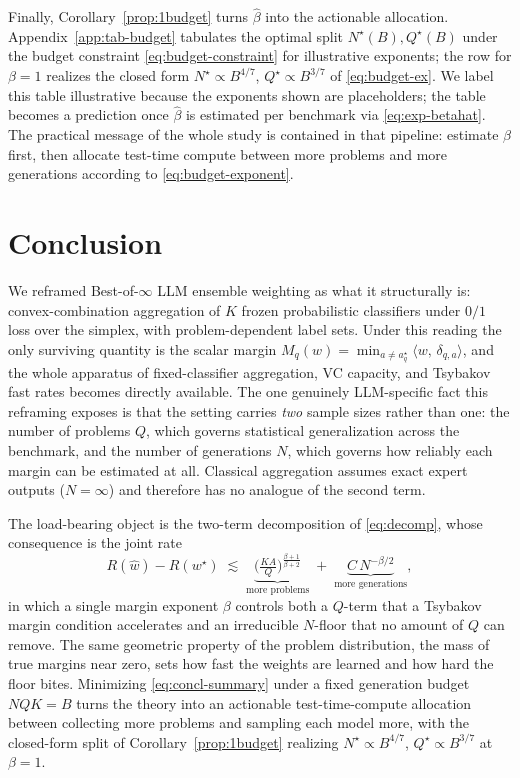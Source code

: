 \documentclass{article} %
\providecommand{\Risk}{R}
\providecommand{\ip}[2]{\langle #1,\, #2\rangle}
\providecommand{\what}{\widehat{w}}
\providecommand{\wstar}{w^{\star}}
\begin{document}
Finally, Corollary~\ref{prop:1budget} turns $\hat\beta$ into the actionable
allocation. Appendix~\ref{app:tab-budget} tabulates the optimal split $N^\star(B),
Q^\star(B)$ under the budget constraint \eqref{eq:budget-constraint} for
illustrative exponents; the row for $\beta=1$ realizes the closed form
$N^\star\propto B^{4/7}$, $Q^\star\propto B^{3/7}$ of \eqref{eq:budget-ex}. We
label this table illustrative because the exponents shown are placeholders; the
table becomes a prediction once $\hat\beta$ is estimated per benchmark via
\eqref{eq:exp-betahat}. The practical message of the whole study is contained in
that pipeline: estimate $\beta$ first, then allocate test-time compute between more
problems and more generations according to \eqref{eq:budget-exponent}.


\section{Conclusion}
\label{sec:conclusion}

We reframed Best-of-$\infty$ LLM ensemble weighting as what it structurally is:
convex-combination aggregation of $K$ frozen probabilistic classifiers under
$0/1$ loss over the simplex, with problem-dependent label sets. Under this
reading the only surviving quantity is the scalar margin
$M_q(w)=\min_{a\ne a_q^\star}\ip{w}{\delta_{q,a}}$, and the whole apparatus of
fixed-classifier aggregation, VC capacity, and Tsybakov fast rates becomes
directly available. The one genuinely LLM-specific fact this reframing exposes is
that the setting carries \emph{two} sample sizes rather than one: the number of
problems $Q$, which governs statistical generalization across the benchmark, and
the number of generations $N$, which governs how reliably each margin can be
estimated at all. Classical aggregation assumes exact expert outputs
($N=\infty$) and therefore has no analogue of the second term.

The load-bearing object is the two-term decomposition of
\eqref{eq:decomp}, whose consequence is the joint rate
\begin{equation}
\label{eq:concl-summary}
\Risk(\what) - \Risk(\wstar)
\;\lesssim\;
\underbrace{\Big(\tfrac{KA}{Q}\Big)^{\frac{\beta+1}{\beta+2}}}_{\text{more problems}}
\;+\;
\underbrace{C\,N^{-\beta/2}}_{\text{more generations}},
\end{equation}
in which a single margin exponent $\beta$ controls both a $Q$-term that a
Tsybakov margin condition accelerates and an irreducible $N$-floor that no amount
of $Q$ can remove. The same geometric property of the problem distribution, the
mass of true margins near zero, sets how fast the weights are learned and how
hard the floor bites. Minimizing \eqref{eq:concl-summary} under a fixed generation
budget $NQK=B$ turns the theory into an actionable test-time-compute allocation
between collecting more problems and sampling each model more, with the closed-form
split of Corollary~\ref{prop:1budget} realizing $N^\star\propto B^{4/7}$,
$Q^\star\propto B^{3/7}$ at $\beta=1$.
\end{document}

